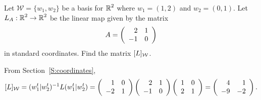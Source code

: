 \documentclass{ximera}
\begin{document}
\begin{exercise} \label{c7.3.1}
Let $\mathcal{W} = \{w_1,w_2\}$ be a basis for $\mbox{$\mathbb{R}$}^2$ where $w_1=(1,2)$ and $w_2=(0,1)$. Let
$L_A:\mbox{$\mathbb{R}$}^2\to\mbox{$\mathbb{R}$}^2$ be the linear map given by the matrix
\[
A=\left(\begin{array}{rr} 2 & 1\\ -1 &0\end{array}\right)
\]
in standard coordinates.  Find the matrix $[L]_{\cal W}$.

\begin{solution}

\soln From Section~\ref{S:coordinates},
\[
[L]_{\cal W} = (w_1^t|w_2^t)^{-1}L(w_1^t|w_2^t) =
\left(\begin{array}{rr} 1 & 0\\ -2 &1\end{array}\right)\left(\begin{array}{rr} 2 & 1\\ -1 &0\end{array}\right)\left(\begin{array}{rr} 1 & 0\\ 2 &1\end{array}\right) =
\left(\begin{array}{rr} 4 & 1\\ -9 &-2\end{array}\right).
\]

\end{solution}
\end{exercise}
\end{document}
